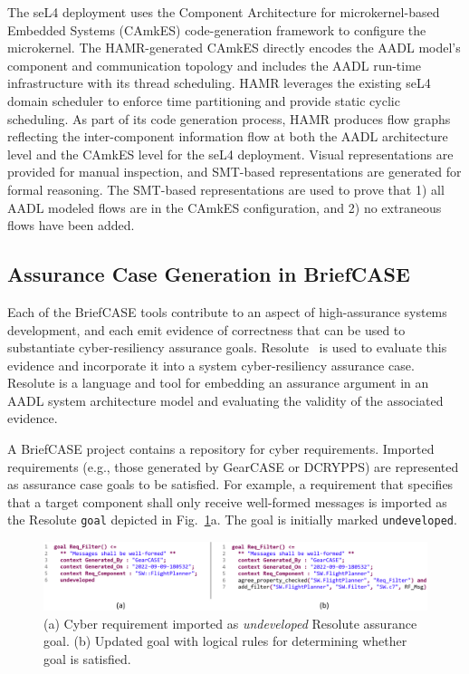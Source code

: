 The seL4 deployment uses the Component Architecture for microkernel-based Embedded Systems (CAmkES) code-generation framework to configure the microkernel. The HAMR-generated CAmkES directly encodes the AADL model’s component and communication topology and includes the AADL run-time infrastructure with its thread scheduling. HAMR leverages the existing seL4 domain scheduler to enforce time partitioning and provide static cyclic scheduling. 
%
As part of its code generation process, HAMR produces flow graphs reflecting the inter-component information flow at both the AADL architecture level and the CAmkES level for the seL4 deployment. Visual representations are provided for manual inspection, and SMT-based representations are generated for formal reasoning. The SMT-based representations are used to prove that 1) all AADL modeled flows are in the CAmkES configuration, and 2) no extraneous flows have been added. 


\subsection{Assurance Case Generation in BriefCASE}

Each of the BriefCASE tools contribute to an aspect of high-assurance systems development, and each emit evidence of correctness that can be used to substantiate cyber-resiliency assurance goals. Resolute~\cite{resolute2014} is used to evaluate this evidence and incorporate it into a system cyber-resiliency assurance case. 
%
Resolute is a language and tool for embedding an assurance argument in an AADL system architecture model and evaluating the validity of the associated evidence.

A BriefCASE project contains a repository for cyber requirements. Imported requirements (e.g., those generated by GearCASE or DCRYPPS) are represented as assurance case goals to be satisfied. 
For example, a requirement that specifies that a target component shall only receive well-formed messages is imported as the Resolute \texttt{goal} depicted in Fig.~\ref{fig:resolute-requirement}a.  The goal is initially marked \texttt{undeveloped}.

\begin{figure}[h] 
	\centering 
	\includegraphics[width=\textwidth]{figs/resolute-requirement.png}
	\caption{(a) Cyber requirement imported as \textit{undeveloped} Resolute assurance goal.  (b) Updated goal with logical rules for determining whether goal is satisfied.}
	\label{fig:resolute-requirement} 
\end{figure}


